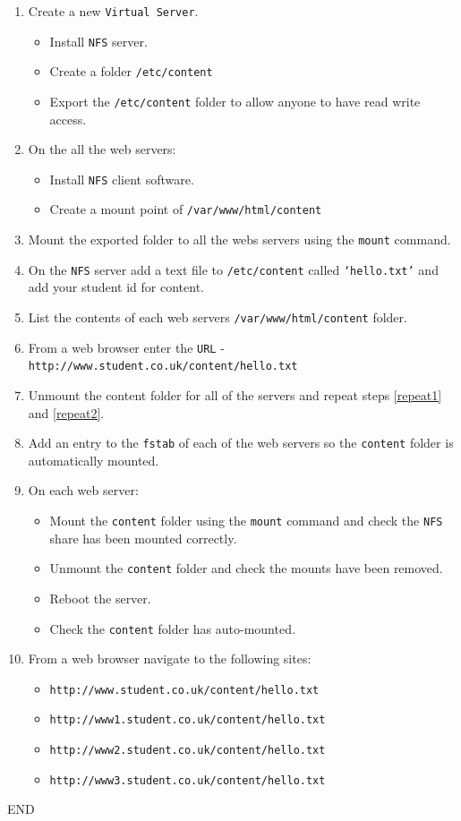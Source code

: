 \documentclass[11pt]{article}
\begin{document}
\begin{enumerate}
    \item Create a new \texttt{Virtual Server}.
        \begin{itemize}
            \item Install \texttt{NFS} server.
            \item Create a folder \texttt{/etc/content}
            \item Export the \texttt{/etc/content} folder to allow anyone to have read write access.
        \end{itemize}
    \item On the all the web servers:
        \begin{itemize}
            \item Install \texttt{NFS} client software.
            \item Create a mount point of \texttt{/var/www/html/content}
        \end{itemize}
    \item Mount the exported folder to all the webs servers using the \texttt{mount} command.
    \item On the \texttt{NFS} server add a text file to \texttt{/etc/content} called \texttt{`hello.txt'} and add your student id for content.
    \item \label{repeat1} List the contents of each web servers \texttt{/var/www/html/content} folder.
    \item \label{repeat2} From a web browser enter the \texttt{URL} - \texttt{http://www.student.co.uk/content/hello.txt}
    \item Unmount the content folder for all of the servers and repeat steps \ref{repeat1} and \ref{repeat2}.
    \item Add an entry to the \texttt{fstab} of each of the web servers so the \texttt{content} folder is automatically mounted.
    \item On each web server:
        \begin{itemize}
            \item Mount the \texttt{content} folder using the \texttt{mount} command and check the \texttt{NFS} share has been mounted correctly.
            \item Unmount the \texttt{content} folder and check the mounts have been removed.
            \item Reboot the server.
            \item Check the \texttt{content} folder has auto-mounted.
        \end{itemize}
    \item From a web browser navigate to the following sites:
        \begin{itemize}
            \item \texttt{http://www.student.co.uk/content/hello.txt}
            \item \texttt{http://www1.student.co.uk/content/hello.txt}
            \item \texttt{http://www2.student.co.uk/content/hello.txt}
            \item \texttt{http://www3.student.co.uk/content/hello.txt}
        \end{itemize}
\end{enumerate}    
END
\end{document}
